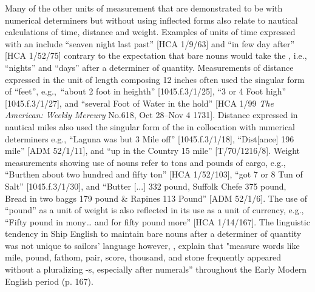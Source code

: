 Many of the other units of measurement that are demonstrated to be  with numerical determiners but without using inflected  forms also relate to nautical calculations of time, distance and weight. Examples of units of time expressed with an   include “seaven night last past” [HCA 1/9/63] and “in few day after” [HCA 1/52/75] contrary to the expectation that bare nouns would take the , i.e., “nights” and “days” after a determiner of quantity. Measurements of distance expressed in the unit of length composing 12 inches often used the singular form of “feet”, e.g.,~“about 2 foot in heighth” [1045.f.3/1/25], “3 or 4 Foot high” [1045.f.3/1/27], and “several Foot of Water in the hold” [HCA 1/99 \textit{The American: Weekly Mercury} No.618, Oct 28–Nov 4 1731]. Distance expressed in nautical miles also used the singular form of the  in collocation with numerical determiners e.g., “Laguna was but 3 Mile off” [1045.f.3/1/18], “Dist[ance] 196 mile” [ADM 52/1/11], and “up in the Country 15 mile” [T/70/1216/8]. Weight measurements showing use of  nouns refer to tons and pounds of cargo, e.g., “Burthen about two hundred and fifty ton” [HCA 1/52/103], “got 7 or 8 Tun of Salt” [1045.f.3/1/30], and “Butter [...] 332 pound, Suffolk Chefe 375 pound, Bread in two baggs 179 pound \& Rapines 113 Pound” [ADM 52/1/6]. The use of  “pound” as a unit of weight is also reflected in its use as a unit of currency, e.g., “Fifty pound in mony… and for fifty pound more” [HCA 1/14/167]. The linguistic tendency in Ship English to maintain  bare nouns after a determiner of quantity was not unique to sailors’ language however, \citealt{MillwardHayes2012}, explain that "measure words like mile, pound, fathom, pair, score, thousand, and stone frequently appeared without a pluralizing -s, especially after numerals” throughout the Early Modern English period (p. 167).

